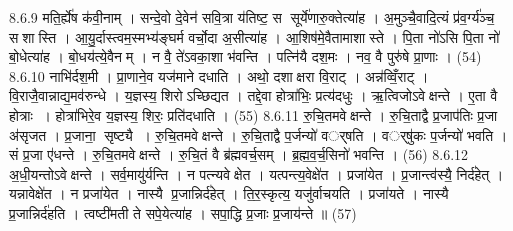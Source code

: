 8.6.9
मति॒र्ह्ये॑ष क॑वी॒नाम् । सन्दे॒वो दे॒वेन॑ सवि॒त्रा य॑तिष्ट॒ स सूर्ये॑णारु॒क्तेत्या॑ह । अ॒मुञ्चै॒वादि॒त्यं प्र॑व॒र्ग्य॑ञ्च॒ सशास्ति । आ॒यु॒र्दास्त्वम॒स्मभ्य॑ङ्घर्म वर्चो॒दा अ॒सीत्या॑ह । आ॒शिष॑मे॒वैतामाशास्ते । पि॒ता नो॑ऽसि पि॒ता नो॑ बो॒धेत्या॑ह । बो॒धय॑त्ये॒वैनम् । न वै॒ ते॑ऽवका॒शा भ॑वन्ति । पत्नि॑यै दश॒मः । नव॒ वै पुरु॑षे प्रा॒णाः । (54)
8.6.10
नाभि॑र्दश॒मी । प्रा॒णाने॒व यज॑माने दधाति । अथो॒ दशाक्षरा वि॒राट् । अन्न॑व्विँ॒राट् । वि॒राजै॒वान्नाद्य॒मव॑रुन्धे । य॒ज्ञस्य॒ शिरोऽच्छिद्यत । तद्दे॒वा होत्रा॑भिः॒ प्रत्य॑दधुः । ऋ॒त्विजोऽवेक्षन्ते । ए॒ता वै होत्राः । होत्रा॑भिरे॒व य॒ज्ञस्य॒ शिरः॒ प्रति॑दधाति । (55)
8.6.11
रु॒चि॒तमवेक्षन्ते । रु॒चि॒ताद्वै प्र॒जाप॑तिः प्र॒जा अ॑सृजत । प्र॒जाना॒ सृष्ट्यै । रु॒चि॒तमवेक्षन्ते । रु॒चि॒ताद्वै प॒र्जन्यो॑ वर््षति । वर््षु॑कः प॒र्जन्यो॑ भवति । सं प्र॒जा ए॑धन्ते । रु॒चि॒तमवेक्षन्ते । रु॒चि॒तं वै ब्र॑ह्मवर्च॒सम् । ब्र॒ह्म॒व॒र्च॒सिनो॑ भवन्ति । (56)
8.6.12
अ॒धी॒यन्तोऽवेक्षन्ते । सर्व॒मायु॑र्यन्ति । न पत्न्यवेक्षेत । यत्पन्त्य॒वेक्षे॑त । प्रजा॑येत । प्र॒जान्त्व॑स्यै॒ निर्द॑हेत् । यन्नावेक्षे॑त । न प्रजा॑येत । नास्यै प्र॒जान्निर्द॑हेत् । ति॒र॒स्कृत्य॒ यजु॑र्वाचयति । प्रजा॑यते । नास्यै प्र॒जान्निर्द॑हति । त्वष्टी॑मती ते सपे॒येत्या॑ह । सपा॒द्धि प्र॒जाः प्र॒जाय॑न्ते ॥ (57)
\anuvakamend

